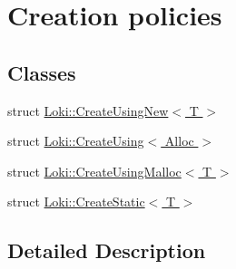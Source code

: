 \hypertarget{group__CreationGroup}{}\section{Creation policies}
\label{group__CreationGroup}
\subsection*{Classes}
\begin{DoxyCompactItemize}
\item 
struct \hyperlink{structLoki_1_1CreateUsingNew}{Loki\+::\+Create\+Using\+New$<$ T $>$}
\item 
struct \hyperlink{structLoki_1_1CreateUsing}{Loki\+::\+Create\+Using$<$ Alloc $>$}
\item 
struct \hyperlink{structLoki_1_1CreateUsingMalloc}{Loki\+::\+Create\+Using\+Malloc$<$ T $>$}
\item 
struct \hyperlink{structLoki_1_1CreateStatic}{Loki\+::\+Create\+Static$<$ T $>$}
\end{DoxyCompactItemize}


\subsection{Detailed Description}
